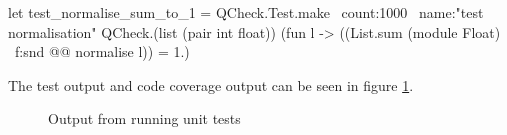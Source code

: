 \begin{ocamlcode-in}
let test_normalise_sum_to_1 =
QCheck.Test.make ~count:1000 ~name:"test normalisation"
QCheck.(list (pair int float)) (fun l ->
((List.sum (module Float) ~f:snd @@ normalise l)) = 1.)
\end{ocamlcode-in}

The test output and code coverage output can be seen in figure \ref{fig:test-out}.
\begin{figure}[!htb]
	\centering
	\qquad
	\caption{Output from running unit tests}
	\label{fig:test-out}
\end{figure}